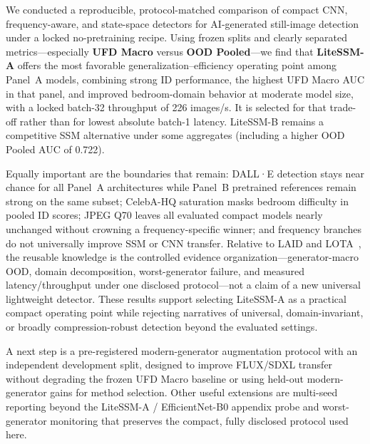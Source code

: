 We conducted a reproducible, protocol-matched comparison of compact CNN, frequency-aware, and state-space detectors for AI-generated still-image detection under a locked no-pretraining recipe.
Using frozen splits and clearly separated metrics---especially \textbf{UFD Macro} versus \textbf{OOD Pooled}---we find that \textbf{LiteSSM-A} offers the most favorable generalization--efficiency operating point among Panel~A models, combining strong ID performance, the highest UFD Macro AUC in that panel, and improved bedroom-domain behavior at moderate model size, with a locked batch-32 throughput of 226 images/s.
It is selected for that trade-off rather than for lowest absolute batch-1 latency.
LiteSSM-B remains a competitive SSM alternative under some aggregates (including a higher OOD Pooled AUC of 0.722).

Equally important are the boundaries that remain: DALL·E detection stays near chance for all Panel~A architectures while Panel~B pretrained references remain strong on the same subset; CelebA-HQ saturation masks bedroom difficulty in pooled ID scores; JPEG Q70 leaves all evaluated compact models nearly unchanged without crowning a frequency-specific winner; and frequency branches do not universally improve SSM or CNN transfer.
Relative to LAID and LOTA~\cite{chivaran2025laid,wang2025lota}, the reusable knowledge is the controlled evidence organization---generator-macro OOD, domain decomposition, worst-generator failure, and measured latency/throughput under one disclosed protocol---not a claim of a new universal lightweight detector.
These results support selecting LiteSSM-A as a practical compact operating point while rejecting narratives of universal, domain-invariant, or broadly compression-robust detection beyond the evaluated settings.

A next step is a pre-registered modern-generator augmentation protocol with an independent development split, designed to improve FLUX/SDXL transfer without degrading the frozen UFD Macro baseline or using held-out modern-generator gains for method selection.
Other useful extensions are multi-seed reporting beyond the LiteSSM-A / EfficientNet-B0 appendix probe and worst-generator monitoring that preserves the compact, fully disclosed protocol used here.
